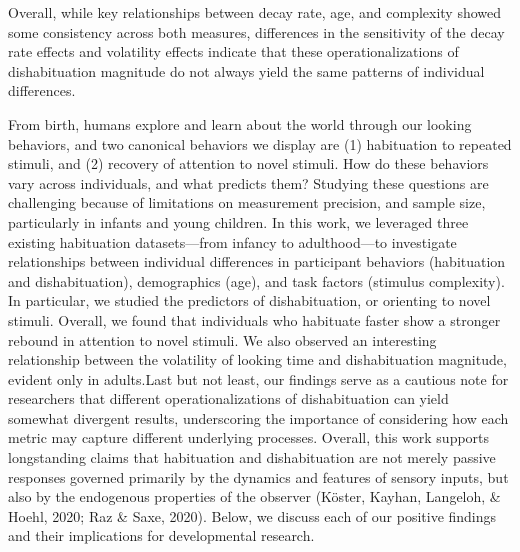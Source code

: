 \documentclass[10pt, letterpaper]{article}
\begin{document}
Overall, while key relationships between decay rate, age, and complexity
showed some consistency across both measures, differences in the
sensitivity of the decay rate effects and volatility effects indicate
that these operationalizations of dishabituation magnitude do not always
yield the same patterns of individual differences.

From birth, humans explore and learn about the world through our looking
behaviors, and two canonical behaviors we display are (1) habituation to
repeated stimuli, and (2) recovery of attention to novel stimuli. How do
these behaviors vary across individuals, and what predicts them?
Studying these questions are challenging because of limitations on
measurement precision, and sample size, particularly in infants and
young children. In this work, we leveraged three existing habituation
datasets---from infancy to adulthood---to investigate relationships
between individual differences in participant behaviors (habituation and
dishabituation), demographics (age), and task factors (stimulus
complexity). In particular, we studied the predictors of dishabituation,
or orienting to novel stimuli. Overall, we found that individuals who
habituate faster show a stronger rebound in attention to novel stimuli.
We also observed an interesting relationship between the volatility of
looking time and dishabituation magnitude, evident only in adults.Last
but not least, our findings serve as a cautious note for researchers
that different operationalizations of dishabituation can yield somewhat
divergent results, underscoring the importance of considering how each
metric may capture different underlying processes. Overall, this work
supports longstanding claims that habituation and dishabituation are not
merely passive responses governed primarily by the dynamics and features
of sensory inputs, but also by the endogenous properties of the observer
(Köster, Kayhan, Langeloh, \& Hoehl, 2020; Raz \& Saxe, 2020). Below, we
discuss each of our positive findings and their implications for
developmental research.
\end{document}
